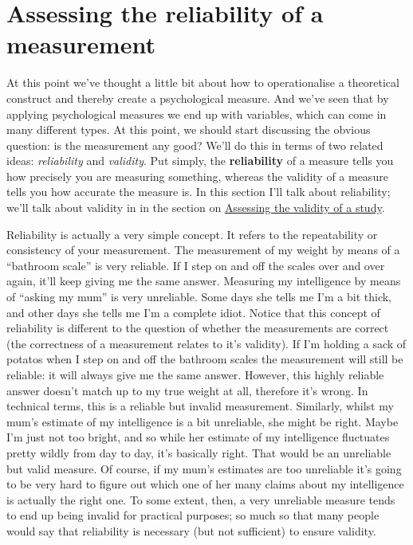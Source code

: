 \documentclass[
]{book}
\begin{document}
\hypertarget{assessing-the-reliability-of-a-measurement}{%
\section{Assessing the reliability of a measurement}\label{assessing-the-reliability-of-a-measurement}}

At this point we've thought a little bit about how to operationalise a theoretical construct and thereby create a psychological measure. And we've seen that by applying psychological measures we end up with variables, which can come in many different types. At this point, we should start discussing the obvious question: is the measurement any good? We'll do this in terms of two related ideas: \emph{reliability} and \emph{validity}. Put simply, the \textbf{reliability} of a measure tells you how precisely you are measuring something, whereas the validity of a measure tells you how accurate the measure is. In this section I'll talk about reliability; we'll talk about validity in in the section on \protect\hyperlink{assessing-the-validity-of-a-study}{Assessing the validity of a study}.

Reliability is actually a very simple concept. It refers to the repeatability or consistency of your measurement. The measurement of my weight by means of a ``bathroom scale'' is very reliable. If I step on and off the scales over and over again, it'll keep giving me the same answer. Measuring my intelligence by means of ``asking my mum'' is very unreliable. Some days she tells me I'm a bit thick, and other days she tells me I'm a complete idiot. Notice that this concept of reliability is different to the question of whether the measurements are correct (the correctness of a measurement relates to it's validity). If I'm holding a sack of potatos when I step on and off the bathroom scales the measurement will still be reliable: it will always give me the same answer. However, this highly reliable answer doesn't match up to my true weight at all, therefore it's wrong. In technical terms, this is a reliable but invalid measurement. Similarly, whilst my mum's estimate of my intelligence is a bit unreliable, she might be right. Maybe I'm just not too bright, and so while her estimate of my intelligence fluctuates pretty wildly from day to day, it's basically right. That would be an unreliable but valid measure. Of course, if my mum's estimates are too unreliable it's going to be very hard to figure out which one of her many claims about my intelligence is actually the right one. To some extent, then, a very unreliable measure tends to end up being invalid for practical purposes; so much so that many people would say that reliability is necessary (but not sufficient) to ensure validity.
\end{document}

